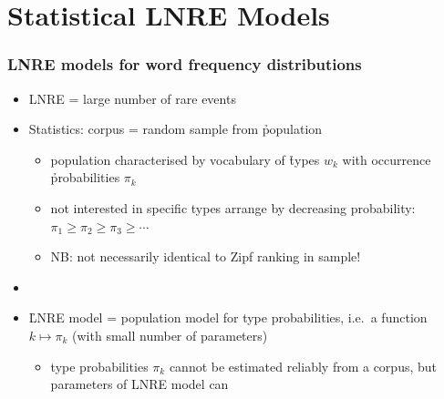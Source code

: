 \documentclass[handout,notes=show,t]{beamer} %
\begin{document}
\section{Statistical LNRE Models}

\begin{frame}
  \frametitle{LNRE models for word frequency distributions}

  \begin{itemize}
  \item LNRE = large number of rare events \citep[cf.][]{Baayen:01}
  \item Statistics: corpus = random sample from \h{population}
    \begin{itemize}
    \item population characterised by vocabulary of \h{types} $w_k$ with
      occurrence \h{probabilities} $\pi_k$
    \item not interested in specific types \so arrange by decreasing
      probability: $\pi_1\geq \pi_2\geq \pi_3 \geq \cdots$
    \item NB: not necessarily identical to Zipf ranking in sample!
    \end{itemize}
  \item[]\pause
  \item \h{LNRE model} = population model for type probabilities, i.e.\ a
    function $k \mapsto \pi_k$ (with small number of parameters)
    \begin{itemize}
    \item type probabilities $\pi_k$ cannot be estimated reliably from a
      corpus, but parameters of LNRE model can
    \end{itemize}
  \end{itemize}
\end{frame}
\end{document}
